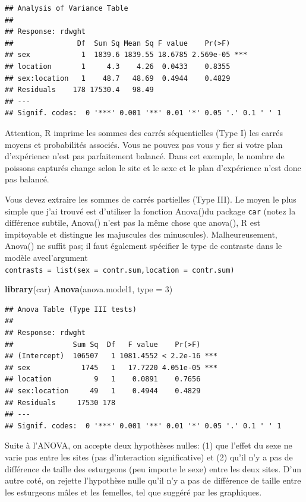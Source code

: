 \documentclass[12pt,]{book}
\makeatletter
\newenvironment{Shaded}{\begin{snugshade}}{\end{snugshade}}
\newcommand{\DataTypeTok}[1]{\textcolor[rgb]{0.27,0.27,0.27}{#1}}
\newcommand{\DecValTok}[1]{\textcolor[rgb]{0.06,0.06,0.06}{#1}}
\newcommand{\KeywordTok}[1]{\textcolor[rgb]{0.27,0.27,0.27}{\textbf{#1}}}
\newcommand{\NormalTok}[1]{#1}
\newenvironment{kframe}{%
\medskip{}
\setlength{\fboxsep}{.8em}
 \def\at@end@of@kframe{}%
 \ifinner\ifhmode%
  \def\at@end@of@kframe{\end{minipage}}%
  \begin{minipage}{\columnwidth}%
 \fi\fi%
 \def\FrameCommand##1{\hskip\@totalleftmargin \hskip-\fboxsep
 \colorbox{shadecolor}{##1}\hskip-\fboxsep
     \hskip-\linewidth \hskip-\@totalleftmargin \hskip\columnwidth}%
 \MakeFramed {\advance\hsize-\width
   \@totalleftmargin\z@ \linewidth\hsize
   \@setminipage}}%
 {\par\unskip\endMakeFramed%
 \at@end@of@kframe}
\newenvironment{rmdblock}[1]
  {
  \begin{itemize}
  \renewcommand{\labelitemi}{
    \raisebox{-.7\height}[0pt][0pt]{
      {\setkeys{Gin}{width=3em,keepaspectratio}\texttt{[image: images/\#1]}}
    }
  }
  \setlength{\fboxsep}{1em}
  \begin{kframe}
  \item
  }
  {
  \end{kframe}
  \end{itemize}
  }
\newenvironment{rmdwarning}
  {\begin{rmdblock}{warning}}
  {\end{rmdblock}}
\makeatother
\begin{document}
\begin{verbatim}
## Analysis of Variance Table
## 
## Response: rdwght
##               Df  Sum Sq Mean Sq F value    Pr(>F)    
## sex            1  1839.6 1839.55 18.6785 2.569e-05 ***
## location       1     4.3    4.26  0.0433    0.8355    
## sex:location   1    48.7   48.69  0.4944    0.4829    
## Residuals    178 17530.4   98.49                      
## ---
## Signif. codes:  0 '***' 0.001 '**' 0.01 '*' 0.05 '.' 0.1 ' ' 1
\end{verbatim}

\begin{rmdwarning}
Attention, R imprime les sommes des carrés séquentielles (Type I) les carrés moyens et probabilités associés. Vous ne pouvez pas vous y fier si votre plan d'expérience n'est pas parfaitement balancé. Dans cet exemple, le nombre de poissons capturés change selon le site et le sexe et le plan d'expérience n'est donc pas balancé.
\end{rmdwarning}

Vous devez extraire les sommes de carrés partielles (Type III). Le moyen le plus simple que j'ai trouvé est d'utiliser la fonction Anova()du package \texttt{car} (notez la différence subtile, Anova() n'est pas la même chose que anova(), R est impitoyable et distingue les majuscules des minuscules). Malheureusement, Anova() ne suffit pas; il faut également spécifier le type de contraste dans le modèle avecl'argument \texttt{contrasts\ =\ list(sex\ =\ contr.sum,location\ =\ contr.sum)}

\begin{Shaded}
\begin{Highlighting}[]
\KeywordTok{library}\NormalTok{(car)}
\KeywordTok{Anova}\NormalTok{(anova.model1, }\DataTypeTok{type =} \DecValTok{3}\NormalTok{)}
\end{Highlighting}
\end{Shaded}

\begin{verbatim}
## Anova Table (Type III tests)
## 
## Response: rdwght
##              Sum Sq  Df   F value    Pr(>F)    
## (Intercept)  106507   1 1081.4552 < 2.2e-16 ***
## sex            1745   1   17.7220 4.051e-05 ***
## location          9   1    0.0891    0.7656    
## sex:location     49   1    0.4944    0.4829    
## Residuals     17530 178                        
## ---
## Signif. codes:  0 '***' 0.001 '**' 0.01 '*' 0.05 '.' 0.1 ' ' 1
\end{verbatim}

Suite à l'ANOVA, on accepte deux hypothèses nulles: (1) que l'effet du sexe ne varie pas entre les sites (pas d'interaction significative) et (2) qu'il n'y a pas de différence de taille des esturgeons (peu importe le sexe) entre les deux sites. D'un autre coté, on rejette l'hypothèse nulle qu'il n'y a pas de différence de taille entre les esturgeons mâles et les femelles, tel que suggéré par les graphiques.
\end{document}
